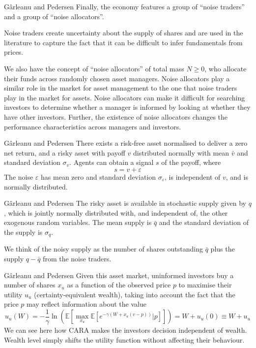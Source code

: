 \documentclass[aspectratio=169,xcolor=dvipsnames]{beamer}
\begin{document}
\begin{frame}{G\^arleanu and Pedersen}
    Finally, the economy features a group of ``noise traders'' and a group of ``noise allocators''.

    Noise traders create uncertainty about the supply of shares and are used in the literature to capture the fact that it can be difficult to infer fundamentals from prices.

    We also have the concept of ``noise allocators'' of total mass $N \ge 0$, who allocate their funds across randomly chosen asset managers. Noise allocators play a similar role in the market for asset management to the one that noise traders play in the market for assets. Noise allocators can make it difficult for searching investors to determine whether a manager is informed by looking at whether they have other investors. Further, the existence of noise allocators changes the performance characteristics across managers and investors.
\end{frame}

\begin{frame}{G\^arleanu and Pedersen}
    There exists a risk-free asset normalised to deliver a zero net return, and a risky asset with payoff $v$ distributed normally with mean $\bar v$ and standard deviation $\sigma_v$. Agents can obtain a signal $s$ of the payoff, where
    \[
        s = v + \varepsilon
    \]
    The noise $\varepsilon$ has mean zero and standard deviation $\sigma_\varepsilon$, is independent of $v$, and is normally distributed.
\end{frame}

\begin{frame}{G\^arleanu and Pedersen}
    The risky asset is available in stochastic supply given by $q$, which is jointly normally distributed with, and independent of, the other exogenous random variables. The mean supply is $\bar q$ and the standard deviation of the supply is $\sigma_q$.

    We think of the noisy supply as the number of shares outstanding $\bar q$ plus the supply $q - \bar q$ from the noise traders.
\end{frame}

\begin{frame}{G\^arleanu and Pedersen}
    Given this asset market, uninformed investors buy a number of shares $x_u$ as a function of the observed price $p$ to maximise their utility $u_u$ (certainty-equivalent wealth), taking into account the fact that the price $p$ may reflect information about the value
    \[
        u_u(W) = -\frac{1}{\gamma} \ln \left( \mathbb{E}\left[\max_{x_u} \mathbb{E}\left[e^{-\gamma(W + x_u(v - p))} \big| p\right]\right]\right) = W + u_u(0) \equiv W + u_u
    \]
    We can see here how CARA makes the investors decision independent of wealth. Wealth level simply shifts the utility function without affecting their behaviour.
\end{frame}
\end{document}
